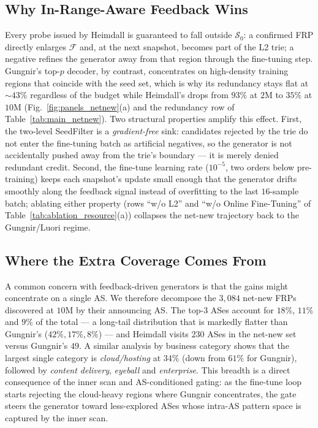 \documentclass[conference]{IEEEtran}
\begin{document}
\subsection{Why In-Range-Aware Feedback Wins}
Every probe issued by Heimdall is guaranteed to fall outside
$\mathcal{S}_{0}$: a confirmed FRP directly enlarges $\mathcal{F}$
and, at the next snapshot, becomes part of the L2 trie; a negative
refines the generator away from that region through the fine-tuning
step.  Gungnir's top-$p$ decoder, by contrast, concentrates on
high-density training regions that coincide with the seed set,
which is why its redundancy stays flat at $\sim\!43\%$ regardless
of the budget while Heimdall's drops from $93\%$ at $2$M to $35\%$
at $10$M (Fig.~\ref{fig:panels_netnew}(a) and the redundancy row of
Table~\ref{tab:main_netnew}).  Two structural properties amplify
this effect.  First, the two-level SeedFilter is a
\emph{gradient-free} sink: candidates rejected by the trie do not
enter the fine-tuning batch as artificial negatives, so the
generator is not accidentally pushed away from the trie's boundary
--- it is merely denied redundant credit.  Second, the fine-tune
learning rate ($10^{-5}$, two orders below pre-training) keeps
each snapshot's update small enough that the generator drifts
smoothly along the feedback signal instead of overfitting to
the last $16$-sample batch; ablating either property
(rows ``w/o L2'' and ``w/o Online Fine-Tuning'' of
Table~\ref{tab:ablation_resource}(a)) collapses the net-new
trajectory back to the Gungnir/Luori regime.

\subsection{Where the Extra Coverage Comes From}
A common concern with feedback-driven generators is that the gains
might concentrate on a single AS.  We therefore decompose the
$3{,}084$ net-new FRPs discovered at $10$M by their announcing AS.
The top-$3$ ASes account for $18\%$, $11\%$ and $9\%$ of the total
--- a long-tail distribution that is markedly flatter than
Gungnir's ($42\%,17\%,8\%$) --- and Heimdall visits $230$ ASes in
the net-new set versus Gungnir's $49$.  A similar analysis by
business category shows that the largest single category is
\emph{cloud/hosting} at $34\%$ (down from $61\%$ for Gungnir),
followed by \emph{content delivery}, \emph{eyeball} and
\emph{enterprise}.  This breadth is a direct consequence of the
inner scan and AS-conditioned gating: as the fine-tune loop starts
rejecting the cloud-heavy regions where Gungnir concentrates,
the gate steers the generator toward less-explored ASes whose
intra-AS pattern space is captured by the inner scan.
\end{document}
